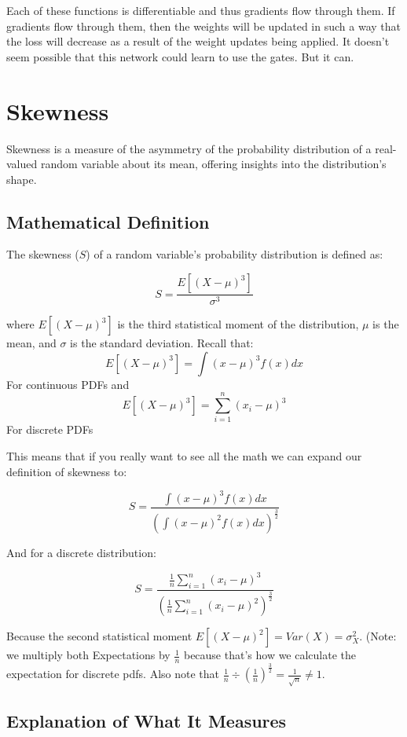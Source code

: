 \documentclass[12pt]{article}
\begin{document}
Each of these functions is differentiable and thus gradients flow through them. If gradients flow through them, then the weights will be updated in such a way that the loss will decrease as a result of the weight updates being applied. It doesn’t seem possible that this network could learn to use the gates. But it can.

\section{Skewness}

Skewness is a measure of the asymmetry of the probability distribution of a real-valued random variable about its mean, offering insights into the distribution's shape.

\subsection{Mathematical Definition}

The skewness (\(S\)) of a random variable's probability distribution is defined as:

\[ S = \frac{E[(X - \mu)^3]}{\sigma^3} \]

where \(E[(X - \mu)^3]\) is the third statistical moment of the distribution, \(\mu\) is the mean, and \(\sigma\) is the standard deviation. Recall that: 
\[E[(X - \mu)^3] = \int (x - \mu)^3 f(x) dx\]
For continuous PDFs and 
\[E[(X - \mu)^3] = \sum_{i=1}^{n} (x_i - \mu)^3\]
For discrete PDFs

This means that if you really want to see all the math we can expand our definition of skewness to:

\[ S = \frac{\int (x - \mu)^3 f(x) dx}{(\int (x - \mu)^2 f(x) dx)^{\frac{3}{2}}} \]

And for a discrete distribution:

\[ S = \frac{\frac{1}{n}\sum_{i=1}^{n} (x_i - \mu)^3}{\left(\frac{1}{n}\sum_{i=1}^{n} (x_i - \mu)^2\right)^{\frac{3}{2}}} \]



Because the second statistical moment  \(E[(X - \mu)^2] = Var(X) = \sigma_X^2\). (Note: we multiply both Expectations by \(\frac{1}{n}\) because that's how we calculate the expectation for discrete pdfs. Also note that \(\frac{1}{n} \div \left(\frac{1}{n}\right)^{\frac{3}{2}} = \frac{1}{\sqrt{n}} \neq 1\).

\subsection{Explanation of What It Measures}
\end{document}
